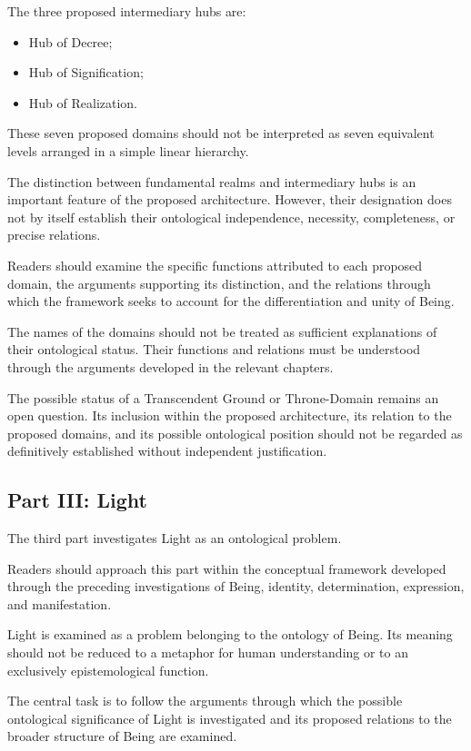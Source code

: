 The three proposed intermediary hubs are:

\begin{itemize}
    \item Hub of Decree;
    \item Hub of Signification;
    \item Hub of Realization.
\end{itemize}

These seven proposed domains should not be
interpreted as seven equivalent levels arranged
in a simple linear hierarchy.

The distinction between fundamental realms and
intermediary hubs is an important feature of
the proposed architecture. However, their
designation does not by itself establish their
ontological independence, necessity, completeness,
or precise relations.

Readers should examine the specific functions
attributed to each proposed domain, the arguments
supporting its distinction, and the relations
through which the framework seeks to account
for the differentiation and unity of Being.

The names of the domains should not be treated
as sufficient explanations of their ontological
status. Their functions and relations must be
understood through the arguments developed
in the relevant chapters.

The possible status of a Transcendent Ground
or Throne-Domain remains an open question.
Its inclusion within the proposed architecture,
its relation to the proposed domains, and its
possible ontological position should not be
regarded as definitively established without
independent justification.

\subsection*{Part III: Light}

The third part investigates Light as an
ontological problem.

Readers should approach this part within
the conceptual framework developed through
the preceding investigations of Being, identity,
determination, expression, and manifestation.

Light is examined as a problem belonging
to the ontology of Being. Its meaning should
not be reduced to a metaphor for human
understanding or to an exclusively epistemological
function.

The central task is to follow the arguments
through which the possible ontological
significance of Light is investigated and
its proposed relations to the broader structure
of Being are examined.

